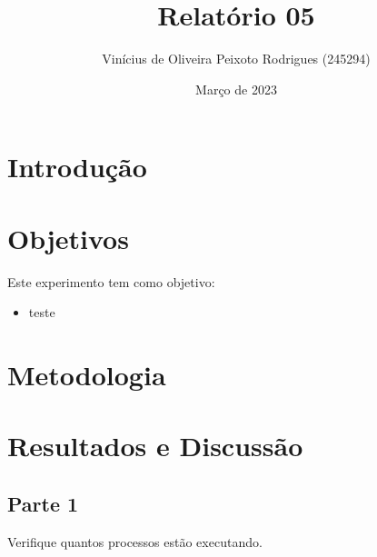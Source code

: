 \documentclass{article}
\title{Relatório 05}
\author{Vinícius de Oliveira Peixoto Rodrigues (245294)}
\date{Março de 2023}
\begin{document}
\maketitle

\section{Introdução}


\section{Objetivos}

Este experimento tem como objetivo:

\begin{itemize}
    \item teste
\end{itemize}

\section{Metodologia}

\section{Resultados e Discussão}

\subsection*{Parte 1}

\begin{tcolorbox}
    Verifique quantos processos estão executando.
\end{tcolorbox}
\end{document}
